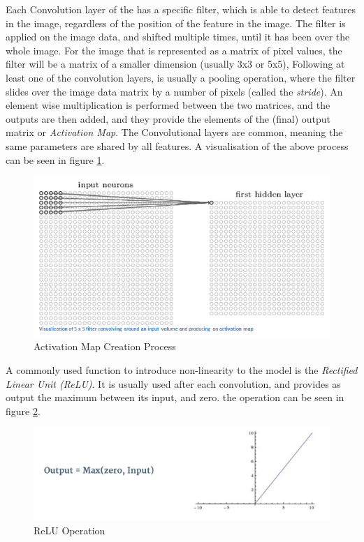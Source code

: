 \documentclass[final,12p,times]{elsarticle}
\begin{document}
Each Convolution layer of the has a specific filter, which is able to detect features in the image, regardless of the position of the feature in the image.
The filter is applied on the image data, and shifted multiple times, until it has been over the whole image. 
For the image that is represented as a matrix of pixel values, the filter will be a matrix of a smaller dimension (usually 3x3 or 5x5), 
Following at least one of the convolution layers, is usually a pooling operation, where the filter slides over the image data matrix by a number of pixels (called the \emph{stride}).
An element wise multiplication is performed between the two matrices, and the outputs are then added, and they provide the elements of the (final) output matrix or \emph{Activation Map}.
The Convolutional layers are common, meaning the same parameters are shared by all features.
A visualisation of the above process can be seen in figure \ref{fig:Fig2.3}.

\begin{figure}[H]
  \includegraphics[width=1.0\textwidth, center]{ActivationMap.png}
  \caption{Activation Map Creation Process}
  \label{fig:Fig2.3}
  \end{figure}

A commonly used function to introduce non-linearity to the model is the \emph{Rectified Linear Unit (ReLU)}.
It is usually used after each convolution, and provides as output the maximum between its input, and zero.
the operation can be seen in figure \ref{fig:Fig2.4}.
\begin{figure}[H]
  \includegraphics[width=1.0\textwidth, center]{relu.png}
  \caption{ReLU Operation}
  \label{fig:Fig2.4}
  \end{figure}
 
\end{document}
